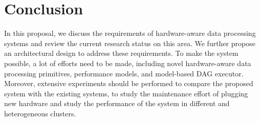 \documentclass[conference]{llncs}
\begin{document}
\section{Conclusion}
\label{sec:conclusion}
In this proposal, we discuss the requirements of hardware-aware data processing systems and review the current research status on this area.
We further propose an architectural design to address these requirements.
To make the system possible, a lot of efforts need to be made, including novel hardware-aware data processing primitives, performance models, and model-based DAG executor.
Moreover, extensive experiments should be performed to compare the proposed system with the existing systems, to study the maintenance effort of plugging new hardware and study the performance of the system in different and heterogeneous clusters.



\end{document}
